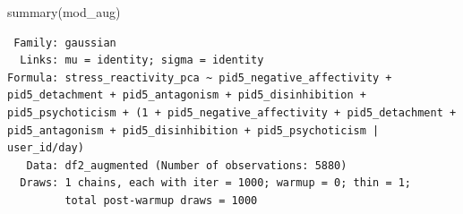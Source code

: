 \documentclass[
  11pt,
  a4paper,
  onecolumn]{article}
\newenvironment{Shaded}{}{}
\newcommand{\FunctionTok}[1]{\textcolor[rgb]{0.44,0.26,0.76}{#1}}
\newcommand{\NormalTok}[1]{\textcolor[rgb]{0.14,0.16,0.18}{#1}}
\begin{document}
\begin{Shaded}
\begin{Highlighting}[]
\FunctionTok{summary}\NormalTok{(mod\_aug)}
\end{Highlighting}
\end{Shaded}

\begin{verbatim}
 Family: gaussian 
  Links: mu = identity; sigma = identity 
Formula: stress_reactivity_pca ~ pid5_negative_affectivity + pid5_detachment + pid5_antagonism + pid5_disinhibition + pid5_psychoticism + (1 + pid5_negative_affectivity + pid5_detachment + pid5_antagonism + pid5_disinhibition + pid5_psychoticism | user_id/day) 
   Data: df2_augmented (Number of observations: 5880) 
  Draws: 1 chains, each with iter = 1000; warmup = 0; thin = 1;
         total post-warmup draws = 1000


\end{verbatim}
\end{document}
